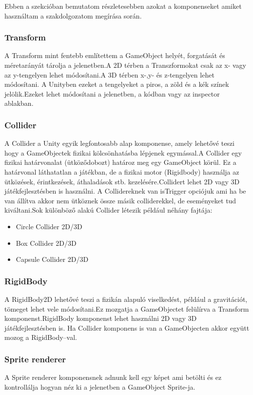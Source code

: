 \documentclass[
]{thesis-ekf}
\theoremstyle{definition}
\theoremstyle{remark}
\begin{document}
Ebben a szekcióban bemutatom részletesebben azokat a komponenseket amiket használtam a szakdolgozatom megírása során.

\subsubsection{Transform}
A Transform  mint fentebb említettem a GameObject helyét, forgatását és méretarányát tárolja a jelenetben.A 2D térben a Transzformokat csak az x- vagy az y-tengelyen lehet módosítani.A 3D térben x-,y- és z-tengelyen lehet módosítani.  A Unityben ezeket a tengelyeket a piros, a zöld és a kék színek jelölik.Ezeket lehet módosítani a jelenetben, a kódban vagy az inspector ablakban.
\subsubsection{Collider}
A Collider a Unity egyik legfontosabb alap komponense, amely lehetővé teszi hogy a GameObjectek fizikai kölcsönhatásba lépjenek egymással.A Collider egy fizikai határvonalat (ütköződobozt) határoz meg egy GameObject körül. Ez a határvonal láthatatlan a játékban, de a fizikai motor (Rigidbody) használja az ütközések, érintkezések, áthaladások stb. kezelésére.Collidert lehet 2D vagy 3D játékfejlesztésben is használni. A Collidereknek van isTrigger opciójuk ami ha be van állítva akkor nem ütköznek össze másik colliderekkel, de eseményeket tud kiváltani.Sok különböző alakú Collider létezik például néhány fajtája:
\begin{itemize}
	\item Circle Collider 2D/3D
	\item Box Collider 2D/3D
	\item Capsule Collider 2D/3D
\end{itemize}

\subsubsection{RigidBody}
A RigidBody2D lehetővé teszi a fizikán alapuló viselkedést, például a gravitációt, tömeget lehet vele módosítani.Ez mozgatja a GameObjectet felülírva a Transform komponenst.RigidBody komponenst lehet használni 2D vagy 3D játékfejlesztésben is. Ha Collider komponens is van a GameObjecten akkor együtt mozog a RigidBody--val.

\subsubsection{Sprite renderer}
A Sprite renderer komponensnek adnunk kell egy képet ami betölti és ez kontrollálja hogyan néz ki a jelenetben a GameObject Sprite-ja.
\end{document}
